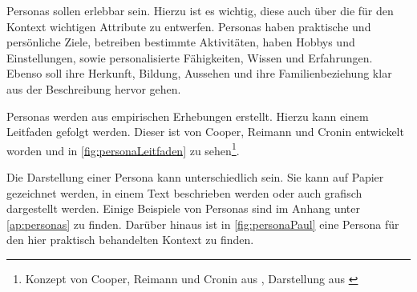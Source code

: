 Personas sollen erlebbar sein.
Hierzu ist es wichtig, diese auch über die für den Kontext wichtigen Attribute zu entwerfen.
Personas haben praktische und persönliche Ziele, betreiben bestimmte Aktivitäten, haben Hobbys und Einstellungen, sowie personalisierte Fähigkeiten, Wissen und Erfahrungen.
Ebenso soll ihre Herkunft, Bildung, Aussehen und ihre Familienbeziehung klar aus der Beschreibung hervor gehen.

Personas werden aus empirischen Erhebungen erstellt.
Hierzu kann einem Leitfaden gefolgt werden.
Dieser ist von Cooper, Reimann und Cronin \cite{PersonaCooperEtA} entwickelt worden und in \autoref{fig:personaLeitfaden} zu sehen\footnote{Konzept von Cooper, Reimann und Cronin aus \cite{PersonaCooperEtA}, Darstellung aus \cite{NOG}}.

Die Darstellung einer Persona kann unterschiedlich sein.
Sie kann auf Papier gezeichnet werden, in einem Text beschrieben werden oder auch grafisch dargestellt werden.
Einige Beispiele von Personas sind im Anhang unter \autoref{ap:personas} zu finden. 
Darüber hinaus ist in \autoref{fig:personaPaul} eine Persona für den hier praktisch behandelten Kontext zu finden.